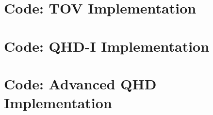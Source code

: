 \chapter{Code: TOV Implementation}\label{ch: tov code}



\chapter{Code: QHD-I Implementation}\label{ch: qhd1 code}



\chapter{Code: Advanced QHD Implementation}\label{ch: advanced code}


 